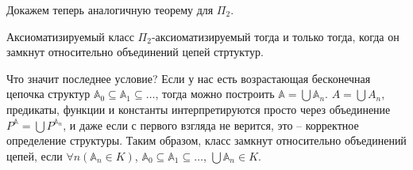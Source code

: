 Докажем теперь аналогичную теорему для $\Pi_2$.  \\ 

\begin{theorem} %
    Аксиоматизируемый класс $\Pi_2$-аксиоматизируемый тогда и только тогда, когда он замкнут относительно объединений цепей стртуктур.
\end{theorem}

\begin{remark}
    Что значит последнее условие? Если у нас есть возрастающая бесконечная цепочка структур $\mathbb{A}_0 \subseteq \mathbb{A}_1 \subseteq \ldots$, тогда можно построить $\mathbb{A} = \bigcup \mathbb{A}_n$. $A = \bigcup A_n$, предикаты, функции  и константы интерпретируются просто через объединение $P^{\mathbb{A}} = \bigcup P^{\mathbb{A}_n}$, и даже если с первого взгляда не верится, это -- корректное определение структуры. Таким образом, класс замкнут относительно объединений цепей, если $\forall n (\mathbb{A}_n \in K)$, $\mathbb{A}_0 \subseteq \mathbb{A}_1 \subseteq \ldots$, $\bigcup \mathbb{A}_n \in K$. 
\end{remark}

